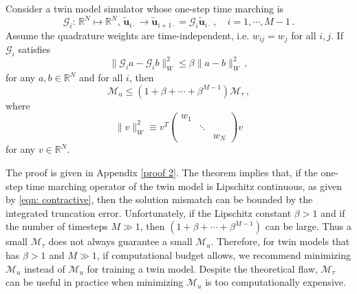 \begin{theorem}
    Consider a twin model simulator whose one-step time marching is
    \begin{equation}
        \mathcal{G}_i:\, \mathbb{R}^N\mapsto\mathbb{R}^N,\, \tilde{\boldsymbol{u}}_{i\cdot}\rightarrow 
        \tilde{\boldsymbol{u}}_{i+1\cdot}=\mathcal{G}_i
        \tilde{\boldsymbol{u}}_{i\cdot} \,,\quad i=1,\cdots, M-1\,.
    \end{equation}
    Assume the quadrature weights are time-independent, i.e.
    $w_{ij} = w_{j}$ for all $i,j$.
    If $\mathcal{G}_i$ satisfies
    \begin{equation}
        \|\mathcal{G}_ia-\mathcal{G}_ib\|^2_{W} \le \beta \|a-b\|^2_{W} \,,
        \label{eqn: contractive}
    \end{equation}
    for any $a, b \in \mathbb{R}^N$ and for all $i$,
    then 
    \begin{equation}
        \mathcal{M}_u \le \left(1+ \beta+ \cdots + \beta^{M-1}\right) \mathcal{M}_{\tau}\,,
    \end{equation}
    where
    \begin{equation}
        \|v\|^2_{W} \equiv v^T 
            \begin{pmatrix}
                {w_{1}} && \\
                & \ddots & \\
                && {w_{N}}
            \end{pmatrix} v
    \end{equation}
    for any $v\in \mathbb{R}^N$.
    \label{theorem: 2}
\end{theorem}
The proof is given in Appendix \ref{proof 2}. The theorem implies that,
if the one-step time marching operator of the twin model is Lipschitz continuous, 
as given by \eqref{eqn: contractive}, then the
solution mismatch can be bounded by the integrated truncation error.
Unfortunately, if the Lipschitz constant $\beta>1$ and if 
the number of timesteps $M\gg 1$, then
$\left(1+ \beta+ \cdots + \beta^{M-1}\right)$ can be large. Thus
a small $\mathcal{M}_{\tau}$ does not always guarantee a small $\mathcal{M}_u$.
Therefore, for twin models that has $\beta>1$ and $M \gg 1$, 
if computational budget allows, we recommend minimizing $\mathcal{M}_u$
instead of $\mathcal{M}_u$ for training a twin model. Despite the theoretical
flaw, $\mathcal{M}_\tau$ can be useful in practice when minimizing $\mathcal{M}_u$ is
too computationally expensive.\\

